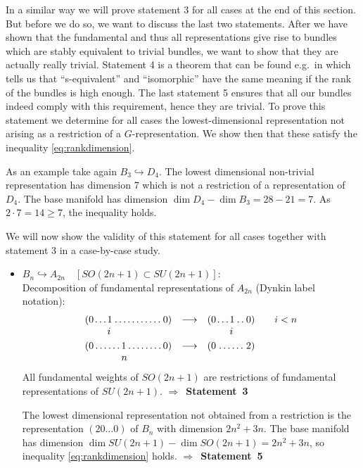 \documentclass[12pt,a4paper]{article}
\newcommand{\embin}{{\hookrightarrow}}
\begin{document}
\begin{appendix}
In a similar way we will prove statement 3 for all cases at the end of
this section. But before
we do so, we want to discuss the last two statements. 
After we have shown that the fundamental and thus all representations
give rise to bundles which are stably equivalent to trivial bundles,
we want to show that they are actually really trivial.
Statement 4 is a theorem that can be found e.g.\ in \cite[Theorem
9.1.5]{Husemoller} which tells us that ``s-equivalent'' and ``isomorphic''
have the same meaning if the rank of the bundles is high enough.
The last statement 5 ensures that all our bundles indeed comply with 
this requirement, hence they are trivial. To prove this statement
we determine for all cases the lowest-dimensional representation
not arising as a restriction of a $G$-representation. We show then that
these satisfy the inequality \eqref{eq:rankdimension}. 

As an example take again $B_{3}\embin D_{4}$. The lowest dimensional
non-trivial representation has dimension 7 which is not a restriction
of a representation of $D_{4}$. The base manifold has dimension $\dim
D_{4}-\dim B_{3}=28-21=7$. As $2\cdot 7=14\geq 7$, the inequality holds.

We will now show the validity of this statement for all cases together
with statement 3 in a case-by-case study. \bigskip 

\begin{itemize}
\item $B_{n}\embin A_{2n}\quad [SO (2n+1)\subset SU (2n+1)]$:\\
Decomposition of fundamental representations of $A_{2n}$ (Dynkin label
notation):
\[
\setlength{\arraycolsep}{0mm}
\begin{array}{p{8mm}p{5mm}p{18mm}cp{8mm}p{9mm}c}
$(0\dotfill$&\multicolumn{2}{c}{$1\dotfill
0)$}&\ \ \ \longrightarrow\ \ \ &$(0\dotfill$&$1\dotfill 0)$&\quad\quad  i<n\\
&$i$& & & &$i$ \\[1mm]
\multicolumn{2}{l}{$(0\dotfill$} &$1\dotfill 0)$&\ \ \longrightarrow\
\ &\multicolumn{2}{l}{$(0\dotfill 2)$}\\
& &$n$& & & 
\end{array}
\]
All fundamental weights of $SO (2n+1)$ are restrictions of fundamental
representations of $SU (2n+1)$. $\Rightarrow $~{\bf Statement~3}

The lowest dimensional representation not obtained from a restriction
is the representation $(20\dots 0)$ of $B_{n}$ with dimension
$2n^{2}+3n$.
The base manifold has dimension $\dim SU (2n+1) - \dim SO
(2n+1)=2n^{2}+3n$, so inequality \eqref{eq:rankdimension}
holds. $\Rightarrow $~{\bf Statement~5}


\end{itemize}
\end{appendix}
\end{document}
